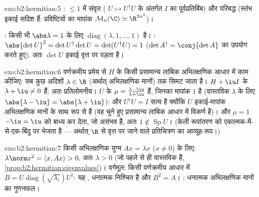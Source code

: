 \begin{solution}{exo:b2:hermitian:5}
: $\leq 1$ में संवृत ( $U \mapsto
U^\dagger U$ के अंतर्गत $I$ का पूर्वप्रतिबिंब) और
परिबद्ध (स्तंभ इकाई सदिश हैं: प्रविष्टियों का मापांक $\mathcal{M}_n(\C) \simeq \R^{2n^2}$)।

: किसी भी $\abs\lambda = 1$ के लिए $\operatorname{diag}(\lambda, 1, \dots, 1)$  है। : $\abs{\det U}^2 = \det
U^\dagger \det U = \det(U^\dagger U) = 1$ ($\det A^\dagger =
\conj{\det A}$ का
उपयोग करते हुए): अतः $\det U$ इकाई वृत्त पर पड़ता है।
\end{solution}

\begin{solution}{exo:b2:hermitian:6}
वर्णक्रमीय प्रमेय से $H$ के किसी प्रसामान्य लांबिक अभिलक्षणिक आधार में
काम कीजिए: सब कुछ अदिशों $\lambda \in \R$ (अर्थात् अभिलक्षणिक मानों) तक सिमट जाता है।
$H + \iu I$ के  $\lambda + \iu \neq 0$ हैं: अतः प्रतिलोमनीय। $U$ के  $\mu = \frac{\lambda - \iu}{\lambda + \iu}$
हैं, जिनका मापांक $1$ है (वास्तविक $\lambda$ के लिए $\abs{\lambda - \iu} = \abs{\lambda + \iu}$): और $U^\dagger U = I$ सत्य है
क्योंकि $U$ इकाई-मापांक अभिलक्षणिक मानों के साथ  रूप से 
है (वह चुने हुए प्रसामान्य लांबिक आधार में विकर्ण है)। और $\mu = 1$ $-\iu = \iu$ को
बाध्य कर देता, जो असंभव है, अतः $1 \notin \operatorname{Sp} U$। (केली रूपांतरण  को
एकात्मक-में-से-एक-बिंदु पर भेजता है --- अर्थात् $\R$ से वृत्त पर जाने वाले
प्रतिचित्रण का आव्यूह-रूप।)
\end{solution}

\begin{solution}{exo:b2:hermitian:7}
किसी अभिलक्षणिक युग्म $Ax = \lambda x$ ($x \neq 0$) के लिए: $\lambda\norm x^2 =
\langle x, Ax\rangle > 0$, अतः $\lambda > 0$ (जो पहले से ही
वास्तविक है, \cref{prop:b2:hermitian:eigenvalues})। वर्गमूल: किसी वर्णक्रमीय आधार में $B = U\operatorname{diag}(\sqrt{\lambda_i})U^\dagger$: यह ,
धनात्मक निश्चित है और $B^2 = A$। : धनात्मक अभिलक्षणिक मानों का गुणनफल।
\end{solution}

